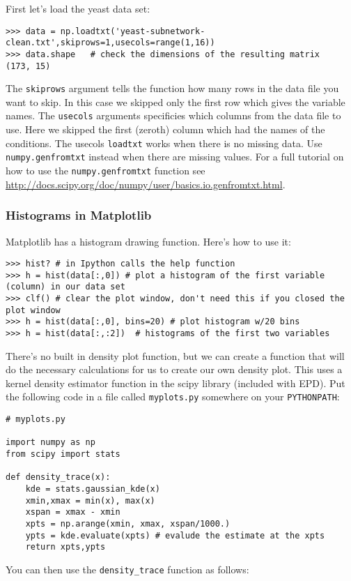 \documentclass{article}
\begin{document}
First let's load the yeast data set:

\begin{lstlisting}
>>> data = np.loadtxt('yeast-subnetwork-clean.txt',skiprows=1,usecols=range(1,16))
>>> data.shape   # check the dimensions of the resulting matrix
(173, 15)
\end{lstlisting}
The \lstinline!skiprows! argument tells the function how many rows in
the data file you want to skip. In this case we skipped only the first
row which gives the variable names. The \lstinline!usecols! arguments
specificies which columns from the data file to use. Here we skipped the
first (zeroth) column which had the names of the conditions. The usecols
\lstinline!loadtxt! works when there is no missing data. Use
\lstinline!numpy.genfromtxt! instead when there are missing values. For
a full tutorial on how to use the \lstinline!numpy.genfromtxt! function
see
\url{http://docs.scipy.org/doc/numpy/user/basics.io.genfromtxt.html}.

\subsubsection{Histograms in Matplotlib}

Matplotlib has a histogram drawing function. Here's how to use it:

\begin{lstlisting}
>>> hist? # in Ipython calls the help function
>>> h = hist(data[:,0]) # plot a histogram of the first variable (column) in our data set
>>> clf() # clear the plot window, don't need this if you closed the plot window
>>> h = hist(data[:,0], bins=20) # plot histogram w/20 bins
>>> h = hist(data[:,:2])  # histograms of the first two variables    
\end{lstlisting}
There's no built in density plot function, but we can create a function
that will do the necessary calculations for us to create our own density
plot. This uses a kernel density estimator function in the scipy library
(included with EPD). Put the following code in a file called
\lstinline!myplots.py! somewhere on your \lstinline!PYTHONPATH!:

\begin{lstlisting}
# myplots.py

import numpy as np
from scipy import stats

def density_trace(x):
    kde = stats.gaussian_kde(x)
    xmin,xmax = min(x), max(x)
    xspan = xmax - xmin
    xpts = np.arange(xmin, xmax, xspan/1000.)
    ypts = kde.evaluate(xpts) # evalude the estimate at the xpts
    return xpts,ypts
\end{lstlisting}
You can then use the \lstinline!density_trace! function as follows:
\end{document}
